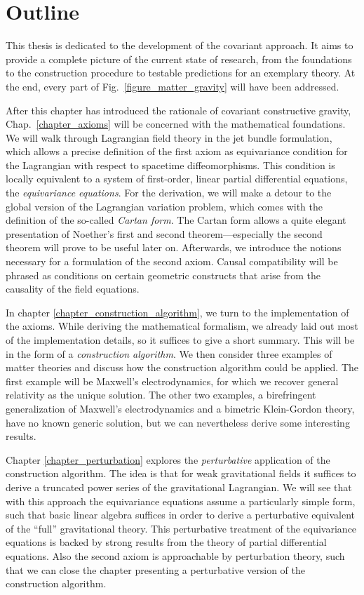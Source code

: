 \section{Outline}

This thesis is dedicated to the development of the covariant approach. It aims to provide a complete picture of the current state of research, from the foundations to the construction procedure to testable predictions for an exemplary theory. At the end, every part of Fig.~\ref{figure_matter_gravity} will have been addressed.

After this chapter has introduced the rationale of covariant constructive gravity, Chap.~\ref{chapter_axioms} will be concerned with the mathematical foundations. We will walk through Lagrangian field theory in the jet bundle formulation, which allows a precise definition of the first axiom as equivariance condition for the Lagrangian with respect to spacetime diffeomorphisms. This condition is locally equivalent to a system of first-order, linear partial differential equations, the \emph{equivariance equations}. For the derivation, we will make a detour to the global version of the Lagrangian variation problem, which comes with the definition of the so-called \emph{Cartan form}. The Cartan form allows a quite elegant presentation of Noether's first and second theorem---especially the second theorem will prove to be useful later on. Afterwards, we introduce the notions necessary for a formulation of the second axiom. Causal compatibility will be phrased as conditions on certain geometric constructs that arise from the causality of the field equations.

In chapter \ref{chapter_construction_algorithm}, we turn to the implementation of the axioms. While deriving the mathematical formalism, we already laid out most of the implementation details, so it suffices to give a short summary. This will be in the form of a \emph{construction algorithm}. We then consider three examples of matter theories and discuss how the construction algorithm could be applied. The first example will be Maxwell's electrodynamics, for which we recover general relativity as the unique solution. The other two examples, a birefringent generalization of Maxwell's electrodynamics and a bimetric Klein-Gordon theory, have no known generic solution, but we can nevertheless derive some interesting results.

Chapter \ref{chapter_perturbation} explores the \emph{perturbative} application of the construction algorithm. The idea is that for weak gravitational fields it suffices to derive a truncated power series of the gravitational Lagrangian. We will see that with this approach the equivariance equations assume a particularly simple form, such that basic linear algebra suffices in order to derive a perturbative equivalent of the ``full'' gravitational theory. This perturbative treatment of the equivariance equations is backed by strong results from the theory of partial differential equations. Also the second axiom is approachable by perturbation theory, such that we can close the chapter presenting a perturbative version of the construction algorithm.

